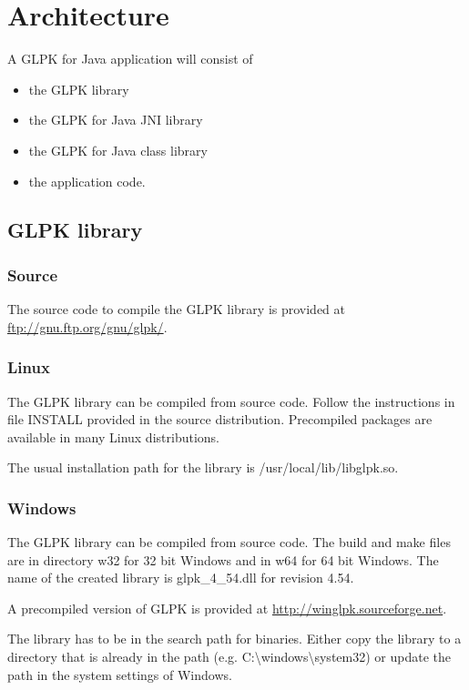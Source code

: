\documentclass[a4paper,11pt]{report}
\newcommand{\glpkVersionMajor}{4}
\newcommand{\glpkVersionMinor}{54}
\begin{document}
\chapter{Architecture}
A GLPK for Java application will consist of
\begin{itemize}
\item the GLPK library
\item the GLPK for Java JNI library
\item the GLPK for Java class library
\item the application code.
\end{itemize}

\section{GLPK library}

\subsection{Source}
The source code to compile the GLPK library is provided at \linebreak\href{ftp://gnu.ftp.org/gnu/glpk/}{ftp://gnu.ftp.org/gnu/glpk/}.

\subsection{Linux}
The GLPK library can be compiled from source code. Follow the instructions in file INSTALL provided in the source distribution. Precompiled packages are available in many Linux distributions.

The usual installation path for the library is /usr/local/lib/libglpk.so.
\subsection{Windows}
The GLPK library can be compiled from source code. The build and make files are in directory w32 for 32 bit Windows and in w64 for 64 bit Windows. The name of the created library is glpk\_\glpkVersionMajor\_\glpkVersionMinor.dll for revision \glpkVersionMajor.\glpkVersionMinor.

A precompiled version of GLPK is provided at \href{http://winglpk.sourceforge.net}{http://winglpk.sourceforge.net}.

The library has to be in the search path for binaries. Either copy the library to a directory that is already in the path (e.g. C:\textbackslash windows\textbackslash system32) or update the path in the system settings of Windows.
\end{document}
